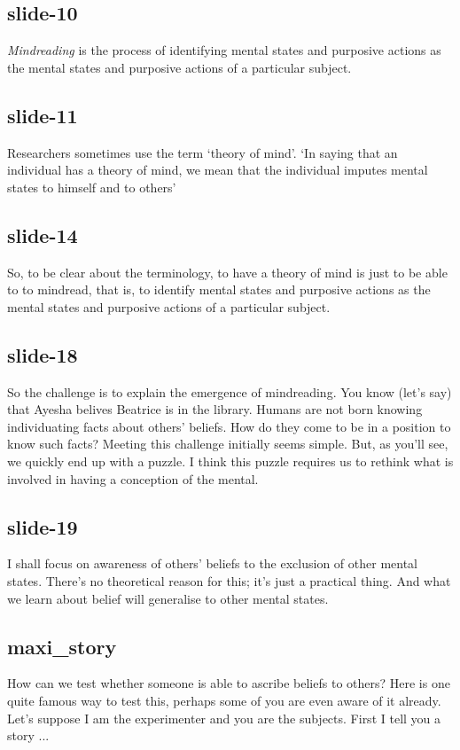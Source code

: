 \documentclass[12pt,\papersize]{extarticle}
\begin{document}
 
\subsection{slide-10}
\textit{Mindreading} is the process of identifying mental states and purposive actions as the mental states and purposive actions of a particular subject.
 
 
\subsection{slide-11}
Researchers sometimes use the term ‘theory of mind’.
‘In saying that an individual has a theory of mind, we mean that the individual imputes mental states to himself and to others’
\citep[p.\ 515]{premack_does_1978}
 
 
\subsection{slide-14}
So, to be clear about the terminology, to have a theory of mind is just to be able to to mindread, that is, to identify mental states and purposive actions as the mental states and purposive actions of a particular subject.
 
 
\subsection{slide-18}
So the challenge is to explain the emergence of mindreading.
You know (let's say) that Ayesha belives Beatrice is in the library.
Humans are not born knowing individuating facts about others' beliefs.
How do they come to be in a position to know such facts?
Meeting this challenge initially seems simple.
But, as you'll see, we quickly end up with a puzzle.
I think this puzzle requires us to rethink what is involved in having a conception of the mental.
 
 
\subsection{slide-19}
I shall focus on awareness of others' beliefs to the exclusion of other mental states.
There's no theoretical reason for this; it's just a practical thing.
And what we learn about belief will generalise to other mental states.
 
 
\subsection{maxi\_story}
How can we test whether someone is able to ascribe beliefs to others?
Here is one quite famous way to test this, perhaps some of you are even aware of it already.
Let's suppose I am the experimenter and you are the subjects.
First I tell you a story ...
 
\end{document}
